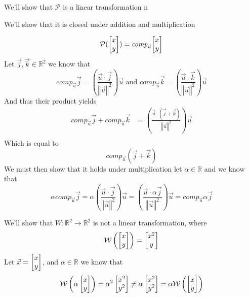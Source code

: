 \documentclass[11pt]{book}
\begin{document}
\begin{eg}
    We'll show that $\mathcal{P}$ is a linear transformation 
    n
    \begin{note}
        We'll show that it is closed under addition and multiplication
    \end{note}
    \begin{equation*}
        \mathcal{P}(\begin{bmatrix} x \\ y \end{bmatrix}) = \mathit{comp}_{\vec{u}} {\begin{bmatrix} x \\ y \end{bmatrix}} 
    \end{equation*}
    Let $\vec{j}, \vec{k} \in \mathbb{R}^2$ we know that 
    \begin{equation*}
        \mathit{comp}_{\vec{u}} {\vec{j}}  = \left( \frac{\vec{u} \cdot
        \vec{j}}{\left\Vert \vec{u} \right\Vert^2} \right) \vec{u} \text{ and }
        \mathit{comp}_{\vec{u}} {\vec{k}}  = \left( \frac{\vec{u} \cdot
        \vec{k}}{\left\Vert \vec{u} \right\Vert^2} \right) \vec{u}
    \end{equation*}
    And thus their product yields
    \begin{align*}
        \mathit{comp}_{\vec{u}} {\vec{j}}  + \mathit{comp}_{\vec{u}} {\vec{k}}
        &= \left( \frac{\vec{u} \cdot \left( \vec{j} + \vec{k}
        \right)}{\left\Vert \vec{u} \right\Vert^2} \right) \vec{u}\\
    \end{align*}
    Which is equal to 
    \begin{equation*}
        \mathit{comp}_{\vec{u}} {\left( \vec{j} + \vec{k} \right)}     
    \end{equation*}
    We must then show that it holds under multiplication let $\alpha \in
    \mathbb{R}$ and we know that 
    \begin{equation*}
        \alpha \mathit{comp}_{\vec{u}} {\vec{j}} = \alpha \left( \frac{\vec{u}
        \cdot \vec{j}}{ \left\Vert \vec{u} \right\Vert^2} \right) \vec{u} =
        \left( \frac{\vec{u} \cdot \alpha \vec{j}}{\left\Vert \vec{u}
        \right\Vert^2} \right) \vec{u} = \mathit{comp}_{\vec{u}} {\alpha \vec{j}} 
    \end{equation*}
\end{eg}

\begin{eg}
    We'll show that $W : \mathbb{R}^2 \to \mathbb{R}^2 $ is not a linear transformation, where
    \begin{equation*}
        \mathcal{W}\left(\begin{bmatrix} x \\ y \end{bmatrix}\right) = \begin{bmatrix} x^2 \\ y \end{bmatrix}
    \end{equation*}
    Let $\vec{x} = \begin{bmatrix} x \\ y \end{bmatrix}$, and $\alpha  \in \mathbb{R}$  we know that
    \begin{equation*}
        \mathcal{W}\left(\alpha \begin{bmatrix} x \\ y \end{bmatrix}\right) = \alpha^2 \begin{bmatrix} x^2 \\ y^2 \end{bmatrix} \neq \alpha \begin{bmatrix} x^2 \\ y^2 \end{bmatrix} = \alpha \mathcal{W}\left(\begin{bmatrix} x \\ y \end{bmatrix}\right) 
    \end{equation*}
\end{eg}
\end{document}
